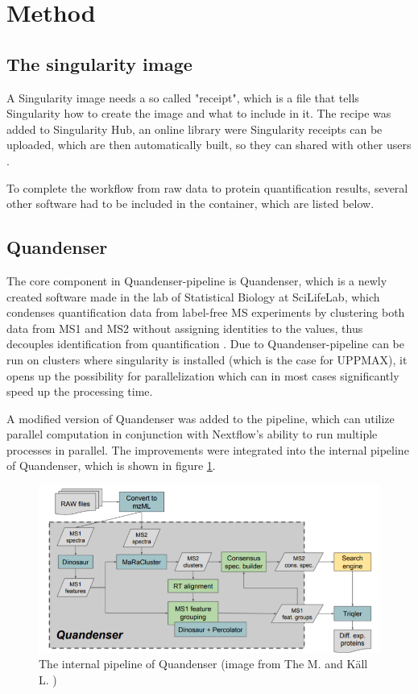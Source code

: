\section{Method}

\subsection{The singularity image}
A Singularity image needs a so called "receipt", which is a file that tells Singularity how to create the image and what to include in it. The recipe was added to Singularity Hub, an online library were Singularity receipts can be uploaded, which are then automatically built, so they can shared with other users \cite{singularity-hub}.

To complete the workflow from raw data to protein quantification results, several other software had to be included in the container, which are listed below.

\subsection{Quandenser} \label{ssec:quandenser-method}
 The core component in Quandenser-pipeline is Quandenser, which is a newly created software made in the lab of Statistical Biology at SciLifeLab, which condenses quantification data from label-free MS experiments by clustering both data from MS1 and MS2 without assigning identities to the values, thus decouples identification from quantification \cite{quandenser}. Due to Quandenser-pipeline can be run on clusters where singularity is installed (which is the case for UPPMAX), it opens up the possibility for parallelization which can in most cases significantly speed up the processing time.

A modified version of Quandenser was added to the pipeline, which can utilize parallel computation in conjunction with Nextflow's ability to run multiple processes in parallel. The improvements were integrated into the internal pipeline of Quandenser, which is shown in figure \ref{fig:quandenser-internal-pipeline}.

\begin{figure}[H]
  \centering
  \includegraphics[width=\linewidth]{pictures/quandenser-internal.png}
  \caption{The internal pipeline of Quandenser (image from The M. and Käll L. \cite{quandenser})}
  \label{fig:quandenser-internal-pipeline}
\end{figure}


